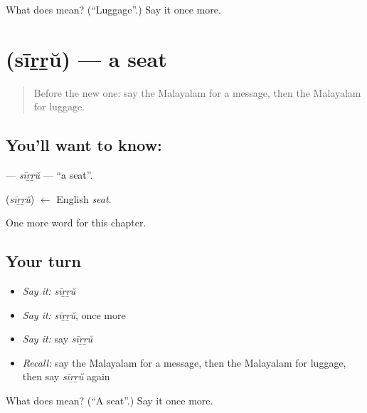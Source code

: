 \begin{tcolorbox}[breakable,colback=teal!4,colframe=teal!35!black,title={Before you move on}]
What does  mean? (\textquotedblleft{}Luggage\textquotedblright{}.) Say it once more.
\end{tcolorbox}
\section[\texorpdfstring{\ml{സീറ്റ്} (sīṟṟŭ)}{സീറ്റ് (sīṟṟŭ)}]{ (sīṟṟŭ) — a seat}

\label{lesson:ML-C210-sirru}



\begin{quote}
Before the new one: say the Malayalam for a message, then the Malayalam for luggage.
\end{quote}

\subsection*{You'll want to know: }
\textbf{} — \emph{sīṟṟŭ} — \textquotedblleft{}a seat\textquotedblright{}.

\begin{cousinweb}
\textbf{} (\emph{sīṟṟŭ}) $\leftarrow$ English \emph{seat}.
\end{cousinweb}

\begin{grammarlens}[title={What you've built}]
One more word for this chapter.
\end{grammarlens}

\subsection*{Your turn}
\begin{itemize}
\raggedright
  \item \emph{Say it:} \emph{sīṟṟŭ}
  \item \emph{Say it:} \emph{sīṟṟŭ}, once more
  \item \emph{Say it:} say \emph{sīṟṟŭ}
  \item \emph{Recall:} say the Malayalam for a message, then the Malayalam for luggage, then say \emph{sīṟṟŭ} again
\end{itemize}

\begin{tcolorbox}[breakable,colback=teal!4,colframe=teal!35!black,title={Before you move on}]
What does  mean? (\textquotedblleft{}A seat\textquotedblright{}.) Say it once more.
\end{tcolorbox}
